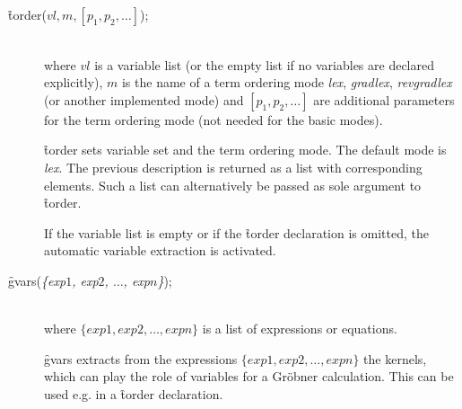 \begin{description}
\item[{\f{torder}($vl,m,[p_1,p_2,\ldots]$);}]\mbox{}\\
  \hypertarget{operator:TORDER}{}
where $vl$ is a variable list (or the empty list if
no variables are declared explicitly),
$m$ is the name of a term ordering mode \emph{lex}, \emph{gradlex},
\emph{revgradlex} (or another implemented mode) and
$[p_1,p_2,\ldots]$ are additional parameters for the
term ordering mode (not needed for the basic modes).

\f{torder} sets variable set and the term ordering mode.
The default mode is \emph{lex}. The previous description is returned
as a list with corresponding elements. Such a list can
alternatively be passed as sole argument to \f{torder}.

If the variable list is empty or if the \f{torder} declaration
is omitted, the automatic variable extraction is activated.

\item[\f{gvars}({\it\{exp$1$, exp$2$, $\ldots$, exp$n$\}});]\mbox{}\\
\hypertarget{operator:GVARS}{}
  where $\{exp1, exp2, \ldots , expn\}$ is a list of expressions or
equations.

\f{gvars} extracts from the expressions $\{exp1, exp2, \ldots , expn\}$
the kernels, which can play the role of variables for a Gr\"obner
calculation. This can be used e.g. in a \f{torder} declaration.
\end{description}

